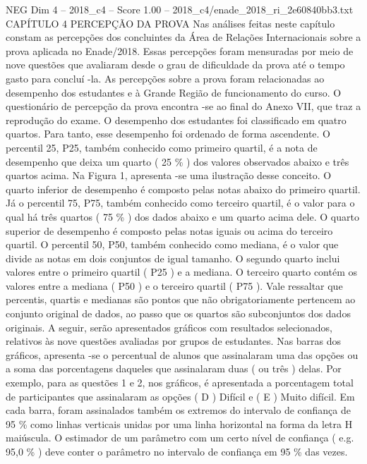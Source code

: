 \begin{textsample}{NEG Dim 4 – 2018\_c4 – Score 1.00 – 2018\_c4/enade\_2018\_ri\_2e60840bb3.txt}  \label{ex:f4_neg_174}
CAPÍTULO 4 PERCEPÇÃO DA PROVA Nas análises feitas neste capítulo constam as percepções dos concluintes da Área de Relações Internacionais sobre a prova aplicada no Enade/2018.
Essas percepções foram mensuradas por meio de nove questões que avaliaram desde o grau de dificuldade da prova até o tempo gasto para concluí -la.
As percepções sobre a prova foram relacionadas ao desempenho dos estudantes e à Grande Região de funcionamento do curso.
O questionário de percepção da prova encontra -se ao final do Anexo VII, que traz a reprodução do exame.
O desempenho dos estudantes foi classificado em quatro quartos.
Para tanto, esse desempenho foi ordenado de forma ascendente.
O percentil 25, P25, também conhecido como primeiro quartil, é a nota de desempenho que deixa um quarto ( 25 \% ) dos valores observados abaixo e três quartos acima.
Na Figura 1, apresenta -se uma ilustração desse conceito.
O quarto inferior de desempenho é composto pelas notas abaixo do primeiro quartil.
Já o percentil 75, P75, também conhecido como terceiro quartil, é o valor para o qual há três quartos ( 75 \% ) dos dados abaixo e um quarto acima dele.
O quarto superior de desempenho é composto pelas notas iguais ou acima do terceiro quartil.
O percentil 50, P50, também conhecido como mediana, é o valor que divide as notas em dois conjuntos de igual tamanho.
O segundo quarto inclui valores entre o primeiro quartil ( P25 ) e a mediana.
O terceiro quarto contém os valores entre a mediana ( P50 ) e o terceiro quartil ( P75 ).
Vale ressaltar que percentis, quartis e medianas são pontos que não obrigatoriamente pertencem ao conjunto original de dados, ao passo que os quartos são subconjuntos dos dados originais.
A seguir, serão apresentados gráficos com resultados selecionados, relativos às nove questões avaliadas por grupos de estudantes.
Nas barras dos gráficos, apresenta -se o percentual de alunos que assinalaram uma das opções ou a soma das porcentagens daqueles que assinalaram duas ( ou três ) delas.
Por exemplo, para as questões 1 e 2, nos gráficos, é apresentada a porcentagem total de participantes que assinalaram as opções ( D ) Difícil e ( E ) Muito difícil.
Em cada barra, foram assinalados também os extremos do intervalo de confiança de 95 \% como linhas verticais unidas por uma linha horizontal na forma da letra H maiúscula.
O estimador de um parâmetro com um certo nível de confiança ( e.g. 95,0 \% ) deve conter o parâmetro no intervalo de confiança em 95 \% das vezes.

\end{textsample}
